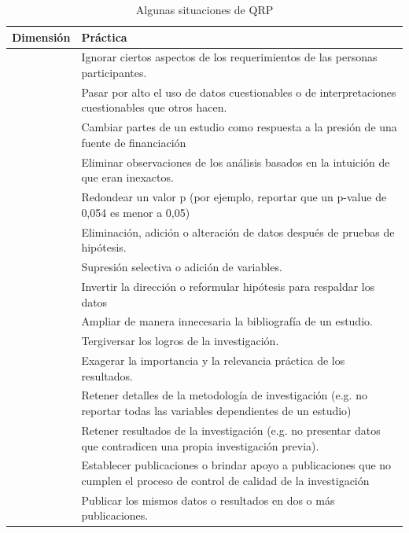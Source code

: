 \documentclass[
]{book}
\begin{document}
\begin{table}[!h]

\caption{\label{tab:tabqrp}Algunas situaciones de QRP}
\centering
\fontsize{10}{12}\selectfont
\begin{tabu} to 
\toprule
Dimensión & Práctica\\
\midrule
 & Ignorar ciertos aspectos de los requerimientos de las personas participantes.\\
 & Pasar por alto el uso de datos cuestionables o de interpretaciones cuestionables que otros hacen.\\
 & Cambiar partes de un estudio como respuesta a la presión de una fuente de financiación\\
 & Eliminar observaciones de los análisis basados en la intuición de que eran inexactos.\\
 & Redondear un valor p (por ejemplo, reportar que un p-value de 0,054 es menor a 0,05)\\
 & Eliminación, adición o alteración de datos después de pruebas de hipótesis.\\
 & Supresión selectiva o adición de variables.\\
 & Invertir la dirección o reformular hipótesis para respaldar los datos\\
 & Ampliar de manera innecesaria la bibliografía de un estudio.\\
 & Tergiversar los logros de la investigación.\\
 & Exagerar la importancia y la relevancia práctica de los resultados.\\
 & Retener detalles de la metodología de investigación (e.g. no reportar todas las variables dependientes de un estudio)\\
 & Retener resultados de la investigación (e.g. no presentar datos que contradicen una propia investigación previa).\\
 & Establecer publicaciones o brindar apoyo a publicaciones que no cumplen el proceso de control de calidad de la investigación\\
 & Publicar los mismos datos o resultados en dos o más publicaciones.\\

\end{tabu}
\end{table}
\end{document}
